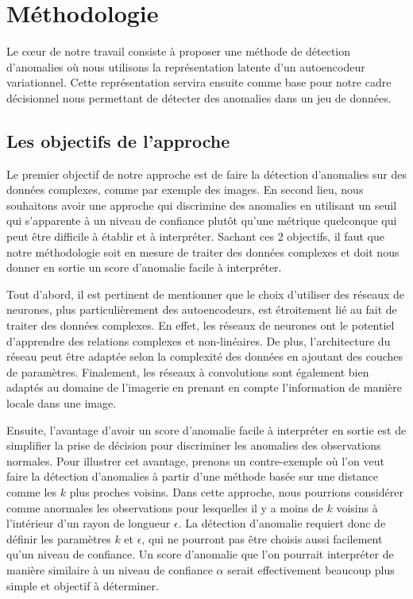 \chapter{Méthodologie}     %
\label{chap:methodologie}                   %

Le cœur de notre travail consiste à proposer une méthode de détection d'anomalies où nous utilisons la représentation latente d'un autoencodeur variationnel. Cette représentation servira ensuite comme base pour notre cadre décisionnel nous permettant de détecter des anomalies dans un jeu de données.

\section{Les objectifs de l'approche} \label{objectifs_metho}

Le premier objectif de notre approche est de faire la détection d'anomalies sur des données complexes, comme par exemple des images. En second lieu, nous souhaitons avoir une approche qui discrimine des anomalies en utilisant un seuil qui s'apparente à un niveau de confiance plutôt qu'une métrique quelconque qui peut être difficile à établir et à interpréter. Sachant ces 2 objectifs, il faut que notre méthodologie soit en mesure de traiter des données complexes et doit nous donner en sortie un score d'anomalie facile à interpréter.

Tout d'abord, il est pertinent de mentionner que le choix  d'utiliser des réseaux de neurones, plus particulièrement des autoencodeurs, est étroitement lié au fait de traiter des données complexes. En effet, les réseaux de neurones ont le potentiel d'apprendre des relations complexes et non-linéaires. De plus, l'architecture du réseau peut être adaptée selon la complexité des données en ajoutant des couches de paramètres. Finalement, les réseaux à convolutions sont également bien adaptés au domaine de l'imagerie en prenant en compte l'information de manière locale dans une image.

Ensuite, l'avantage d'avoir un score d'anomalie facile à interpréter en sortie est de simplifier la prise de décision pour discriminer les anomalies des observations normales. Pour illustrer cet avantage, prenons un contre-exemple où l'on veut faire la détection d'anomalies à partir d'une méthode basée sur une distance comme les $k$ plus proches voisins. Dans cette approche, nous pourrions considérer comme anormales les observations pour lesquelles il y a moins de $k$ voisins à l'intérieur d'un rayon de longueur $\epsilon$. La détection d'anomalie requiert donc de définir les paramètres $k$ et $\epsilon$, qui ne pourront pas être choisis aussi facilement qu'un niveau de confiance. Un score d'anomalie que l'on pourrait interpréter de manière similaire à un niveau de confiance $\alpha$ serait effectivement beaucoup plus simple et objectif à déterminer.


